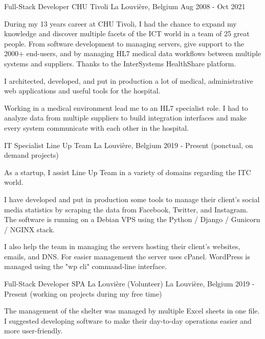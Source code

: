 

\begin{cventries}

  \cventry
    {Full-Stack Developer} %
    {CHU Tivoli} %
    {La Louvière, Belgium} %
    {Aug 2008 - Oct 2021} %
    {
During my 13 years career at CHU Tivoli, I had the chance to expand my knowledge and discover multiple facets of the ICT world in a team of 25  great people. From software development to managing servers, give support to the 2000+ end-users, and by managing HL7 medical data workflows between multiple systems and suppliers. Thanks to the InterSystems HealthShare platform.
    
I architected, developed, and put in production a lot of medical, administrative web applications and useful tools for the hospital.

Working in a medical environment lead me to an HL7 specialist role. I had to analyze data from multiple suppliers to build integration interfaces and make every system communicate with each other in the hospital.

    }

  \cventry
    {IT Specialist} %
    {Line Up Team} %
    {La Louvière, Belgium} %
    {2019 - Present (ponctual, on demand projects)} %
    {
As a startup, I assist Line Up Team in a variety of domains regarding the ITC world.

I have developed and put in production some tools to manage their client's social media statistics by scraping the data from Facebook, Twitter, and Instagram. The software is running on a Debian VPS using the Python / Django / Gunicorn / NGINX stack.

I also help the team in managing the servers hosting their client's websites, emails, and DNS. For easier management the server uses cPanel. WordPress is managed using the "wp cli" command-line interface.

    }
    
    
  \cventry
    {Full-Stack Developer} %
    {SPA La Louvière (Volunteer)} %
    {La Louvière, Belgium} %
    {2019 - Present (working on projects during my free time)} %
    {
The management of the shelter was managed by multiple Excel sheets in one file.
I suggested developing software to make their day-to-day operations easier and more user-friendly.

}
\end{cventries}
